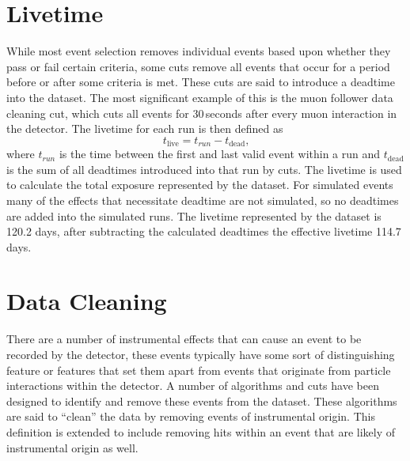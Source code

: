 \section{Livetime}
While most event selection removes individual events based upon whether they
pass or fail certain criteria, some cuts remove all events that occur for a
period before or after some criteria is met.
These cuts are said to introduce a deadtime into the dataset.
The most significant example of this is the muon follower data cleaning cut, which
cuts all events for 30\,seconds after every muon interaction in the detector.
The livetime for each run is then defined as
\begin{equation}
    t_{\mathrm{live}} = t_{run} - t_{\mathrm{dead}}\text{,}
\end{equation}
where $t_{run}$ is the time between the first and last valid event within a run
and $t_{\mathrm{dead}}$ is the sum of all deadtimes introduced into that run by cuts.
The livetime is used to calculate the total exposure represented by the dataset.
For simulated events many of the effects that necessitate deadtime are not simulated,
so no deadtimes are added into the simulated runs.
The livetime represented by the dataset is 120.2 days, after subtracting the
calculated deadtimes the effective livetime  114.7 days.

\section{Data Cleaning}
There are a number of instrumental effects that can cause an event
to be recorded by the detector, these events typically have some
sort of distinguishing feature or features that set them apart
from events that originate from particle interactions within the
detector.
A number of algorithms and cuts have been designed to identify and remove
these events from the dataset.
These algorithms are said to ``clean'' the data by removing events
of instrumental origin. This definition is extended to include removing
hits within an event that are likely of instrumental origin as well.

